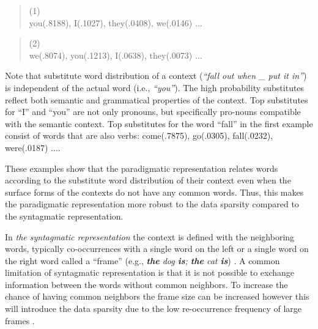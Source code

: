 \begin{quote}
  \small
  (1) \\
   you(.8188), I(.1027), they(.0408), we(.0146) $\ldots$
\end{quote}

\begin{quote}
  \small
  (2) \\
   we(.8074), you(.1213), I(.0638), they(.0073) $\ldots$
\end{quote}

Note that substitute word distribution of a context ({\it ``fall out when \_
put it in''}) is independent of the actual word (i.e., {\it ``you''}).  The
high probability substitutes reflect both semantic and grammatical properties
of the context.  Top substitutes for ``I'' and ``you'' are not only pronouns,
but specifically pro-nouns compatible with the semantic context.  Top
substitutes for the word ``fall'' in the first example consist of words that
are also verbs: come(.7875), go(.0305), fall(.0232), were(.0187) $\ldots$.

These examples show that the paradigmatic representation relates words according
to the substitute word distribution of their context even when the surface
forms of the contexts do not have any common words.  Thus, this makes the
paradigmatic representation more robust to the data sparsity compared to the
syntagmatic representation.



In {\em the syntagmatic representation} the context is defined with the neighboring
words, typically co-occurrences with a single word on the left or a single word
on the right word called a ``frame'' (e.g., {\em {\bf the} dog {\bf is}; {\bf
the} cat {\bf is}}) \citep*{SchutzePe93,Redington98distributionalinformation,
Mintz200391,clair2010,lamar-EtAl:2010:Short,maron2010sphere}. A common
limitation of syntagmatic representation is that it is not possible to exchange
information between the words without common neighbors.  To increase the chance
of having common neighbors the frame size can be increased however this will
introduce the data sparsity due to the low re-occurrence frequency of large
frames \citep*{manning99foundations}.


